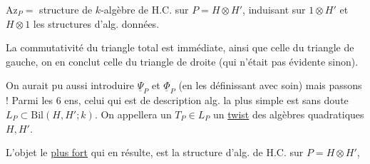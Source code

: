 
$\mathrm{Az}_P=$ structure de $k$-algèbre de H.C.
sur $P=H\otimes H'$, induisant sur $1\otimes H'$
et $H\otimes1$ les structures d'alg. données.


La commutativité du triangle total
est immédiate, ainsi que celle du
triangle de gauche, on en conclut
celle du triangle de droite (qui
n'était pas évidente sinon).

 On aurait pu aussi
introduire $\underline\Psi_P$ et $\underline\Phi_P$ (en les définissant
avec soin) mais passons ! Parmi les
6  ens, celui qui est de
description alg. la plus simple est
sans doute $L_P\subset\mathrm{Bil}(H,H';k)$. On
appellera un $T_P\in L_P$ un \uline{twist}
des algèbres  quadratiques
$H,H'$.


L'objet le \uline{plus fort}
qui en résulte, est la structure
d'alg. de H.C. sur $P=H\otimes H'$,

